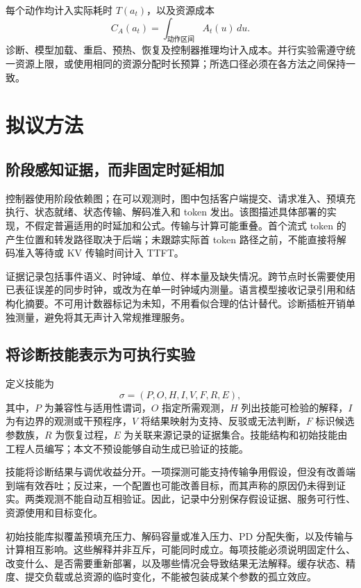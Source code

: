 \documentclass[UTF8,11pt,a4paper,fontset=windows]{ctexart}
\begin{document}
每个动作均计入实际耗时 $T(a_t)$，以及资源成本
\begin{equation}
 C_A(a_t)=\int_{\text{动作区间}} A_t(u)\,du.
\end{equation}
诊断、模型加载、重启、预热、恢复及控制器推理均计入成本。并行实验需遵守统一资源上限，或使用相同的资源分配时长预算；所选口径必须在各方法之间保持一致。

\section{拟议方法}
\subsection{阶段感知证据，而非固定时延相加}
控制器使用阶段依赖图；在可以观测时，图中包括客户端提交、请求准入、预填充执行、状态就绪、状态传输、解码准入和 token 发出。该图描述具体部署的实现，不假定普遍适用的时延加和公式。传输与计算可能重叠。首个流式 token 的产生位置和转发路径取决于后端；未跟踪实际首 token 路径之前，不能直接将解码准入等待或 KV 传输时间计入 TTFT。

证据记录包括事件语义、时钟域、单位、样本量及缺失情况。跨节点时长需要使用已表征误差的同步时钟，或改为在单一时钟域内测量。语言模型接收记录引用和结构化摘要。不可用计数器标记为未知，不用看似合理的估计替代。诊断插桩开销单独测量，避免将其无声计入常规推理服务。

\subsection{将诊断技能表示为可执行实验}
定义技能为
\begin{equation}
 \sigma=(P,O,H,I,V,F,R,E),
\end{equation}
其中，$P$ 为兼容性与适用性谓词，$O$ 指定所需观测，$H$ 列出技能可检验的解释，$I$ 为有边界的观测或干预程序，$V$ 将结果映射为支持、反驳或无法判断，$F$ 标识候选参数族，$R$ 为恢复过程，$E$ 为关联来源记录的证据集合。技能结构和初始技能由工程人员编写；本文不预设能够自动生成已验证的技能。

技能将诊断结果与调优收益分开。一项探测可能支持传输争用假设，但没有改善端到端有效吞吐；反过来，一个配置也可能改善目标，而其声称的原因仍未得到证实。两类观测不能自动互相验证。因此，记录中分别保存假设证据、服务可行性、资源使用和目标变化。

初始技能库拟覆盖预填充压力、解码容量或准入压力、PD 分配失衡，以及传输与计算相互影响。这些解释并非互斥，可能同时成立。每项技能必须说明固定什么、改变什么、是否需要重新部署，以及哪些情况会导致结果无法解释。缓存状态、精度、提交负载或总资源的临时变化，不能被包装成某个参数的孤立效应。
\end{document}
